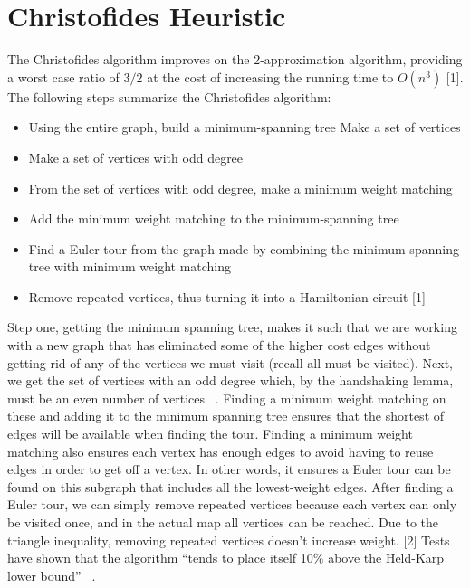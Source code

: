 \documentclass{article}
\begin{document}
\section{Christofides Heuristic}

The Christofides algorithm improves on the 2-approximation algorithm, providing
a worst case ratio of $3/2$ at the cost of increasing the running time to
$O(n^3)$ [1].\\

The following steps summarize the Christofides algorithm:
\begin{itemize}
  \item Using the entire graph, build a minimum-spanning tree Make a set of
        vertices
  \item Make a set of vertices with odd degree
  \item From the set of vertices with odd degree, make a minimum weight matching
  \item Add the minimum weight matching to the minimum-spanning tree
  \item Find a Euler tour from the graph made by combining the minimum spanning
        tree with minimum weight matching
  \item Remove repeated vertices, thus turning it into a Hamiltonian circuit [1]
\end{itemize}

Step one, getting the minimum spanning tree, makes it such that we are working
with a new graph that has eliminated some of the higher cost edges without
getting rid of any of the vertices we must visit (recall all must be visited).
Next, we get the set of vertices with an odd degree which, by the handshaking
lemma, must be an even number of vertices ~\cite{goodrich2015christofides}. Finding a minimum weight matching
on these and adding it to the minimum spanning tree ensures that the shortest
of edges will be available when finding the tour. Finding a minimum weight
matching also ensures each vertex has enough edges to avoid having to reuse
edges in order to get off a vertex. In other words, it ensures a Euler tour
can be found on this subgraph that includes all the lowest-weight edges. After
finding a Euler tour, we can simply remove repeated vertices because each vertex
can only be visited once, and in the actual map all vertices can be reached. Due
to the triangle inequality, removing repeated vertices doesn’t increase weight.
[2] Tests have shown that the algorithm “tends to place itself 10\% above the
Held-Karp lower bound” ~\cite{nilsson2003heuristics}.\\
\end{document}
